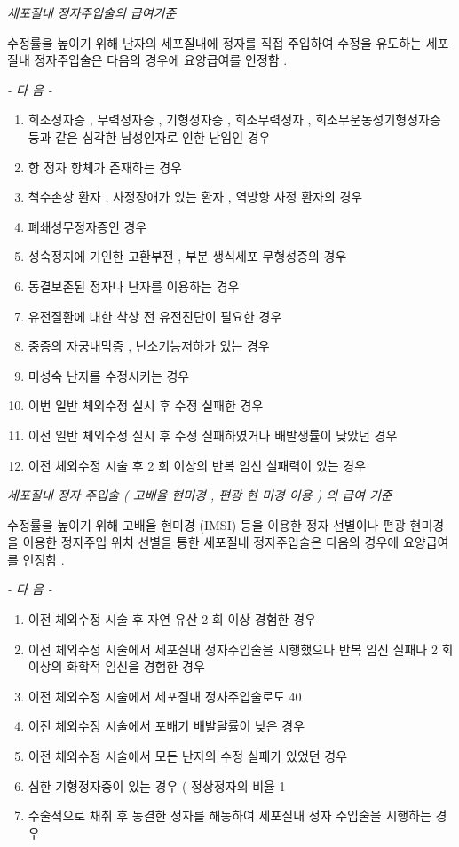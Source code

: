 \par 
\emph{세포질내  정자주입술의  급여기준} \par 
수정률을 높이기 위해 난자의 세포질내에 정자를 직접 주입하여 수정을 유도하는 세포질내 정자주입술은 다음의 경우에 요양급여를 인정함 . \par

\emph{-  다 음  -}\par 
\begin{enumerate}[가.]\tightlist
\item 희소정자증 ,  무력정자증 ,  기형정자증 ,  희소무력정자 ,  희소무운동성기형정자증 등과 같은 심각한 남성인자로 인한 난임인 경우 
\item 항 정자 항체가 존재하는 경우 
\item 척수손상 환자 ,  사정장애가 있는 환자 ,  역방향 사정 환자의 경우 
\item 폐쇄성무정자증인 경우  
\item 성숙정지에 기인한 고환부전 ,  부분 생식세포 무형성증의 경우 
\item 동결보존된 정자나 난자를 이용하는 경우  
\item 유전질환에 대한 착상 전 유전진단이 필요한 경우 
\item 중증의 자궁내막증 ,  난소기능저하가 있는 경우 
\item 미성숙 난자를 수정시키는 경우 
\item 이번 일반 체외수정 실시 후 수정 실패한 경우  
\item 이전 일반 체외수정 실시 후 수정 실패하였거나 배발생률이 낮았던 경우 
\item 이전 체외수정 시술 후  2 회 이상의 반복 임신 실패력이 있는 경우 
\end{enumerate} 

\emph{세포질내 정자 주입술 ( 고배율 현미경 ,  편광 현 미경 이용 ) 의  급여 기준 }\par
수정률을 높이기 위해 고배율 현미경 (IMSI)  등을 이용한 정자  선별이나 편광 현미경을 이용한 정자주입 위치 선별을 통한 세포질내 정자주입술은 다음의 경우에 요양급여를 인정함 . \par

\emph{-  다 음  -}\par 
\begin{enumerate}[가.]\tightlist
\item 이전 체외수정 시술 후 자연 유산  2 회 이상 경험한 경우 
\item 이전 체외수정 시술에서 세포질내 정자주입술을 시행했으나  반복 임신 실패나  2 회 이상의 화학적 임신을 경험한 경우 
\item 이전 체외수정 시술에서 세포질내 정자주입술로도  40%
\item 이전 체외수정 시술에서 포배기 배발달률이 낮은 경우 
\item 이전 체외수정 시술에서 모든 난자의 수정 실패가 있었던 경우 
\item 심한 기형정자증이 있는 경우 ( 정상정자의 비율  1%
\item 수술적으로 채취 후 동결한 정자를 해동하여 세포질내 정자 주입술을 시행하는 경우 
\end{enumerate} 

